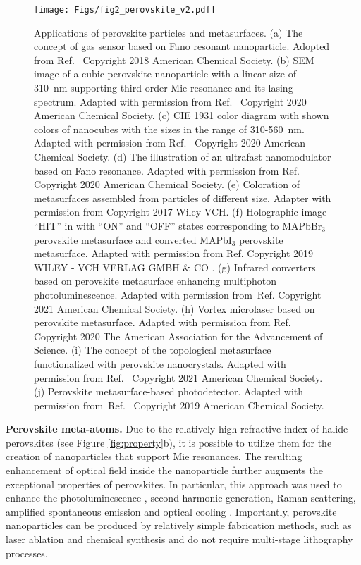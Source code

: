 \documentclass[journal=chreay,manuscript=review]{achemso}
\begin{document}
\begin{figure}
    \centering
    \texttt{[image: Figs/fig2\_perovskite\_v2.pdf]}
    \caption{
      Applications of perovskite particles and metasurfaces. (a) The concept of gas sensor based on Fano resonant nanoparticle. Adopted from Ref.~ Copyright 2018 American Chemical Society. (b) SEM image of a cubic perovskite nanoparticle with a linear size of 310~nm supporting third-order Mie resonance and its lasing spectrum. Adapted with permission from Ref.~ Copyright 2020 American Chemical Society. (c) CIE 1931 color diagram with shown colors of nanocubes with the sizes in the range of 310-560~nm. Adapted with permission from Ref.~ Copyright 2020 American Chemical Society. (d) The illustration of an ultrafast nanomodulator based on Fano resonance. Adapted with permission from Ref. Copyright 2020 American Chemical Society.
      (e) Coloration of metasurfaces assembled from particles of different size. Adapter with permission from  Copyright 2017 Wiley-VCH. 
    (f) Holographic image “HIT” in with “ON” and “OFF” states corresponding to MAPbBr$_3$ perovskite metasurface and converted MAPbI$_3$ perovskite metasurface. Adapted with permission from Ref. Copyright 2019 WILEY - VCH VERLAG GMBH \& CO .
    (g) Infrared converters based on perovskite metasurface enhancing multiphoton photoluminescence. Adapted with permission from~Ref. Copyright 2021 American Chemical Society.
    (h) Vortex microlaser based on perovskite metasurface. Adapted with permission from Ref.~ Copyright 2020 The American Association for the Advancement of Science.
    (i) The concept of the topological metasurface functionalized with perovskite nanocrystals. Adapted with permission from  Ref.~ Copyright 2021 American Chemical Society.
   (j) Perovskite metasurface-based photodetector. Adapted with permission from~Ref.~ Copyright 2019 American Chemical Society. }
    \label{fig:pero2l}
\end{figure}


\textbf{Perovskite meta-atoms.}
Due to the relatively high refractive index of halide perovskites (see Figure \ref{fig:property}b), it is possible to utilize them for the creation of nanoparticles that support Mie resonances. The resulting enhancement of optical field inside the nanoparticle further augments the exceptional properties of perovskites. %
In particular, this approach was used to enhance the photoluminescence \cite{tiguntseva2018light}, second harmonic generation, Raman scattering, amplified spontaneous emission \cite{tiguntseva2020room} and optical cooling \cite{tonkaev2019optical}. Importantly, perovskite nanoparticles can be produced by relatively simple fabrication methods, such as laser ablation \cite{tiguntseva2018light, tiguntseva2018tunable} and chemical synthesis \cite{tiguntseva2020room} and do not require multi-stage lithography processes.
 
\end{document}
